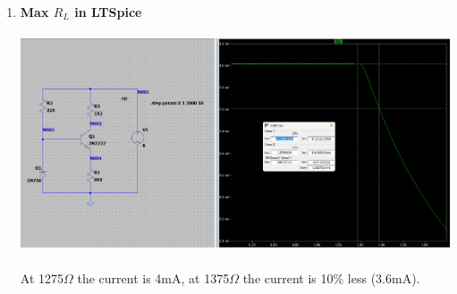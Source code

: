 \documentclass{article}
\begin{document}
\begin{enumerate}
			\pagebreak
			\item  \textbf{Max \(R_L\) in LTSpice}\\\\
			\includegraphics[scale=0.4]{prelab 3 ex2 rl}\\\\
			At 1275\(\Omega\) the current is 4mA, at 1375\(\Omega\) the current is 10\% less (3.6mA).  
		\end{enumerate}
\end{document}
